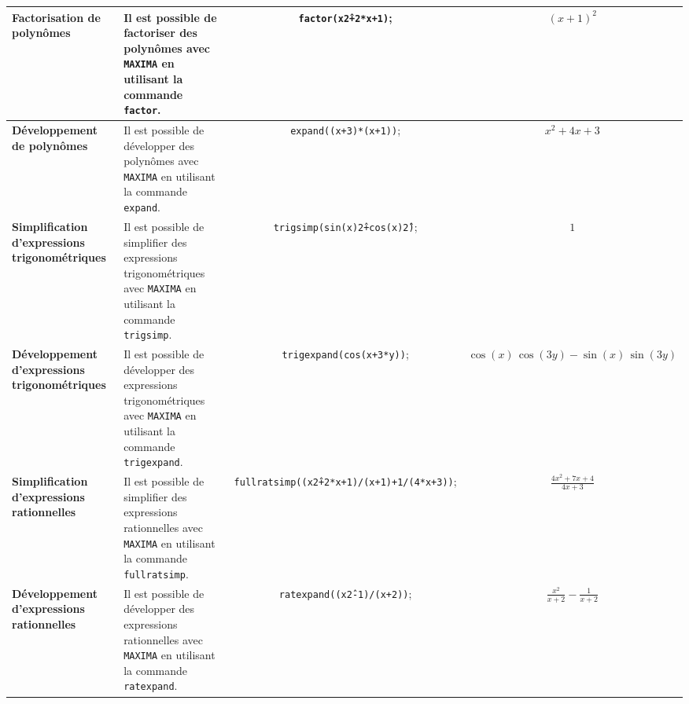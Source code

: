 \documentclass[8pt,landscape]{article}
\begin{document}
\begin{center}
\begin{longtable}{@{}p{4cm}p{10cm}cc@{}}
\midrule

\textbf{Factorisation de polynômes} & Il est possible de factoriser des polynômes avec \texttt{MAXIMA} en utilisant la commande \texttt{factor}. & \texttt{factor(x\^2+2*x+1)}; & $(x+1)^2$ \\

\midrule

\textbf{Développement de polynômes} & Il est possible de développer des polynômes avec \texttt{MAXIMA} en utilisant la commande \texttt{expand}. & \texttt{expand((x+3)*(x+1))}; & $x^2+4x+3$ \\

\midrule

\textbf{Simplification d'expressions trigonométriques} & Il est possible de simplifier des expressions trigonométriques avec \texttt{MAXIMA} en utilisant la commande \texttt{trigsimp}. & \texttt{trigsimp(sin(x)\^2+cos(x)\^2)}; & $1$ \\

\midrule

\textbf{Développement d'expressions trigonométriques} & Il est possible de développer des expressions trigonométriques avec \texttt{MAXIMA} en utilisant la commande \texttt{trigexpand}. & \texttt{trigexpand(cos(x+3*y))}; & $\cos{(x)}\,\cos{(3y)}-\sin{(x)}\,\sin{(3y)}$ \\

\midrule

\textbf{Simplification d'expressions rationnelles} & Il est possible de simplifier des expressions rationnelles avec \texttt{MAXIMA} en utilisant la commande \texttt{fullratsimp}. & \tiny{\texttt{fullratsimp((x\^2+2*x+1)/(x+1)+1/(4*x+3))}}; & $\frac{4{{x}^{2}}+7x+4}{4x+3}$ \\

\midrule

\textbf{Développement d'expressions rationnelles} & Il est possible de développer des expressions rationnelles avec \texttt{MAXIMA} en utilisant la commande \texttt{ratexpand}. & \texttt{ratexpand((x\^2-1)/(x+2))}; & $\frac{{{x}^{2}}}{x+2}-\frac{1}{x+2}$ \\

\bottomrule
\end{longtable}
\end{center}
\end{document}
